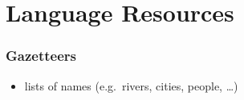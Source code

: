 \section{Language Resources}

\begin{frame}
\frametitle{Gazetteers}
\begin{itemize}
   	\item lists of names (e.g.~rivers, cities, people, \ldots)
\end{itemize}   

\end{frame}